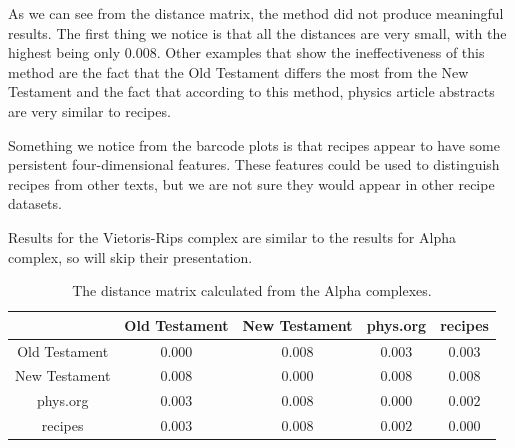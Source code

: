 \documentclass[12pt,a4paper]{amsart}
\begin{document}
As we can see from the distance matrix, the method did not produce meaningful
results. The first thing we notice is that all the distances are very small,
with the highest being only $0.008$. Other examples that show the
ineffectiveness of this method are the fact that the Old Testament differs the
most from the New Testament and the fact that according to this method, physics
article abstracts are very similar to recipes.

Something we notice from the barcode plots is that recipes appear to have some
persistent four-dimensional features. These features could be used to
distinguish recipes from other texts, but we are not sure they would appear in
other recipe datasets.

Results for the Vietoris-Rips complex are similar to the results for Alpha
complex, so will skip their presentation.

\begin{table}
  \centering
  \begin{tabular}{c|cccc}
                  & Old Testament & New Testament & phys.org & recipes \\ \hline
    Old Testament & $0.000$ & $0.008$ & $0.003$ & $0.003$ \\
    New Testament & $0.008$ & $0.000$ & $0.008$ & $0.008$ \\
    phys.org      & $0.003$ & $0.008$ & $0.000$ & $0.002$ \\
    recipes       & $0.003$ & $0.008$ & $0.002$ & $0.000$ \\
  \end{tabular}

  \caption{The distance matrix calculated from the Alpha complexes.}
  \label{tab:alpha}
\end{table}
\end{document}
